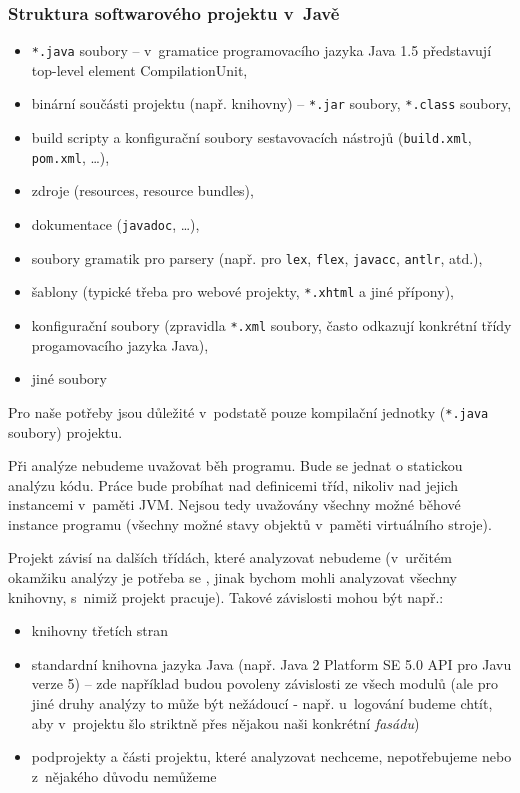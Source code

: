 \subsubsection{Struktura softwarového projektu v~Javě}


\begin{itemize}
\item \verb+*.java+ soubory -- v~gramatice programovacího jazyka Java 1.5 představují top-level element CompilationUnit,
\item binární součásti projektu (např. knihovny) -- \verb+*.jar+ soubory, \verb+*.class+ soubory,
\item build scripty a konfigurační soubory sestavovacích nástrojů (\verb+build.xml+, \verb+pom.xml+, \ldots),
\item zdroje (resources, resource bundles),
\item dokumentace (\verb+javadoc+, \ldots),
\item soubory gramatik pro parsery (např. pro \verb+lex+, \verb+flex+, \verb+javacc+, \verb+antlr+, atd.),
\item šablony (typické třeba pro webové projekty, \verb+*.xhtml+ a jiné přípony),
\item konfigurační soubory (zpravidla \verb+*.xml+ soubory, často odkazují konkrétní třídy progamovacího jazyka Java),
\item jiné soubory
\end{itemize}

Pro naše potřeby jsou důležité v~podstatě pouze kompilační jednotky (\verb+*.java+ soubory) projektu.

Při analýze nebudeme uvažovat běh programu. Bude se jednat o statickou analýzu kódu. Práce bude probíhat nad definicemi tříd, nikoliv nad jejich instancemi v~paměti JVM. Nejsou tedy uvažovány všechny možné běhové instance programu (všechny možné stavy objektů v~paměti virtuálního stroje).

Projekt závisí na dalších třídách, které analyzovat nebudeme (v~určitém okamžiku analýzy je potřeba se , jinak bychom mohli analyzovat všechny knihovny, s~nimiž projekt pracuje). Takové závislosti mohou být např.:

\begin{itemize}
\item knihovny třetích stran
\item standardní knihovna jazyka Java (např. Java 2 Platform SE 5.0 API pro Javu verze 5) -- zde například budou povoleny závislosti ze všech modulů (ale pro jiné druhy analýzy to může být nežádoucí - např. u~logování budeme chtít, aby v~projektu šlo striktně přes nějakou naši konkrétní \emph{fasádu})
\item podprojekty a části projektu, které analyzovat nechceme, nepotřebujeme nebo z~nějakého důvodu nemůžeme
\end{itemize}


